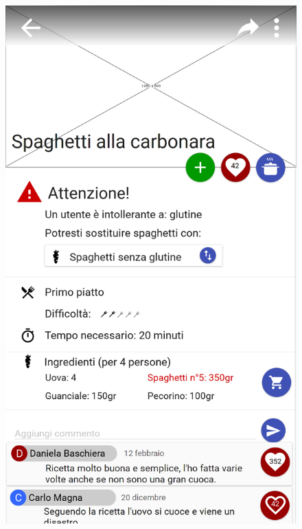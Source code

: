 \begin{figure}[H]
\begin{minipage}{.49\textwidth}
		\includegraphics[width=\textwidth]{img/wireframe/presentazione_ricetta_allergia_cambio_ingrediente_aggiungi_ricetta_1.png}
	\end{minipage}
\end{figure}
